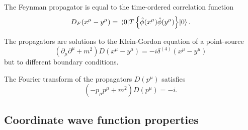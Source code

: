 \begin{corollary}
	The Feynman propagator is equal to the time-ordered correlation function
	\begin{equation}
		D_F(x^\mu-y^\mu)
		=
		\expval{T\left\{\hat\phi(x^\mu)\hat\phi(y^\mu)\right\}}{0}
		.
	\end{equation}
\end{corollary}
\begin{lemma}\label{thm:propagator_kg_solution}
	The propagators are solutions to the Klein-Gordon equation of a point-source
	\begin{equation}
		\left(
			\partial_\mu
			\partial^\mu
			+
			m^2
		\right)
		D(x^\mu-y^\mu)
		=
		-i\delta^{(4)}(x^\mu-y^\mu)
	\end{equation}
	but to different boundary conditions.
\end{lemma}
\begin{corollary}
	The Fourier transform of the propagators $D(p^\mu)$ satisfies
	\begin{equation}
		\left(
			-
			p_\mu p^\mu
			+
			m^2
		\right)
		D(p^\mu)
		=
		-i
		.
	\end{equation}
\end{corollary}

\subsection{Coordinate wave function properties}

